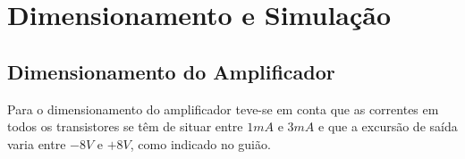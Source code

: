 \documentclass[a4paper]{article}
\begin{document}
\author{\\\bigskip\bigskip\bigskip\bigskip\bigskip\bigskip\bigskip\bigskip\bigskip\bigskip\bigskip\\
        Mafalda Pereira Varela - up201403432\\
        António Tomás Costa Nunes - up201405099}

\date{\bigskip\bigskip\textbf{Dezembro de 2016}}

\maketitle

\newpage



\tableofcontents

\newpage




\section{Dimensionamento e Simulação}
    \medskip
    \subsection{Dimensionamento do Amplificador}
        \bigskip
    Para o dimensionamento do amplificador teve-se em conta que as correntes em todos os transistores se têm de situar entre $1mA$ e $3mA$ e que a excursão de saída varia entre $-8V$ e $+8V$, como indicado no guião.
        
\end{document}
